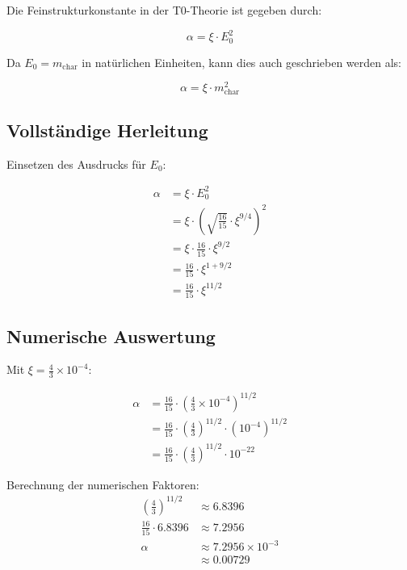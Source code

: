 \documentclass[12pt,a4paper]{article}
\newcommand{\xipar}{\xi}
\begin{document}
	Die Feinstrukturkonstante in der T0-Theorie ist gegeben durch:
	
	\begin{equation}
		\boxed{\alpha = \xipar \cdot E_0^2}
	\end{equation}
	
	Da $E_0 = m_{\text{char}}$ in nat\"urlichen Einheiten, kann dies auch geschrieben werden als:
	
	\begin{equation}
		\alpha = \xipar \cdot m_{\text{char}}^2
	\end{equation}
	
	\subsection{Vollst\"andige Herleitung}
	
	Einsetzen des Ausdrucks f\"ur $E_0$:
	
	\begin{align}
		\alpha &= \xipar \cdot E_0^2 \\
		&= \xipar \cdot \left( \sqrt{\frac{16}{15}} \cdot \xipar^{9/4} \right)^2 \\
		&= \xipar \cdot \frac{16}{15} \cdot \xipar^{9/2} \\
		&= \frac{16}{15} \cdot \xipar^{1 + 9/2} \\
		&= \frac{16}{15} \cdot \xipar^{11/2}
	\end{align}
	
	\subsection{Numerische Auswertung}
	
	Mit $\xipar = \frac{4}{3} \times 10^{-4}$:
	
	\begin{align}
		\alpha &= \frac{16}{15} \cdot \left( \frac{4}{3} \times 10^{-4} \right)^{11/2} \\
		&= \frac{16}{15} \cdot \left( \frac{4}{3} \right)^{11/2} \cdot (10^{-4})^{11/2} \\
		&= \frac{16}{15} \cdot \left( \frac{4}{3} \right)^{11/2} \cdot 10^{-22}
	\end{align}
	
	Berechnung der numerischen Faktoren:
	\begin{align}
		\left( \frac{4}{3} \right)^{11/2} &\approx 6.8396 \\
		\frac{16}{15} \cdot 6.8396 &\approx 7.2956 \\
		\alpha &\approx 7.2956 \times 10^{-3} \\
		&\approx 0.00729
	\end{align}
	
\end{document}
